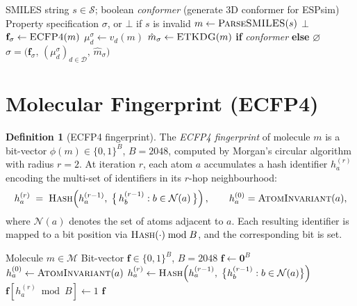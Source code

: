 \documentclass[11pt, a4paper]{article}
\theoremstyle{definition}
\newtheorem{definition}{Definition}[section]
\newcommand{\1}[1]{\mathbf{1}\!\left[#1\right]}   %
\newcommand{\Desc}{\mathcal{D}}                     %
\newcommand{\fp}[1]{\phi(#1)}                       %
\begin{document}
\begin{algorithm}[H]
\caption{\textsc{MakeSpec}$(s,\, \textit{conformer})$ --- construct a property specification}
\label{alg:makespec}
\begin{algorithmic}[1]
\Require SMILES string $s \in \mathcal{S}$;
         boolean \textit{conformer} (generate 3D conformer for ESPsim)
\Ensure  Property specification $\sigma$, or $\bot$ if $s$ is invalid
\State $m \leftarrow \textsc{ParseSMILES}(s)$
 \Return $\bot$ \EndIf
\State $\mathbf{f}_\sigma \leftarrow \textsc{ECFP4}(m)$
\For{$d \in \Desc$}
  \State $\mu_d^\sigma \leftarrow v_d(m)$
\EndFor
\State $\hat{m}_\sigma \leftarrow \textsc{ETKDG}(m)$ \textbf{if} \textit{conformer} \textbf{else} $\varnothing$
\Return $\sigma = \bigl(\mathbf{f}_\sigma,\, (\mu_d^\sigma)_{d \in \Desc},\, \hat{m}_\sigma\bigr)$
\end{algorithmic}
\end{algorithm}


\section{Molecular Fingerprint (ECFP4)}
\label{sec:ecfp4}

\begin{definition}[ECFP4 fingerprint]
\label{def:ecfp4}
The \emph{ECFP4 fingerprint} of molecule $m$ is a bit-vector
$\fp{m} \in \{0,1\}^B$, $B = 2048$, computed by Morgan's circular
algorithm with radius $r = 2$.
At iteration $r$, each atom $a$ accumulates a hash identifier
$h_a^{(r)}$ encoding the multi-set of identifiers in its $r$-hop
neighbourhood:
\[
  h_a^{(r)} \;=\; \textsc{Hash}\!\left(h_a^{(r-1)},\;
    \bigl\{\, h_b^{(r-1)} : b \in \mathcal{N}(a) \,\bigr\}\right),
  \qquad h_a^{(0)} = \textsc{AtomInvariant}(a),
\]
where $\mathcal{N}(a)$ denotes the set of atoms adjacent to $a$.
Each resulting identifier is mapped to a bit position via
$\textsc{Hash}(\cdot) \bmod B$, and the corresponding bit is set.
\end{definition}

\begin{algorithm}[H]
\caption{\textsc{ECFP4}$(m)$ --- compute the ECFP4 fingerprint}
\label{alg:ecfp4}
\begin{algorithmic}[1]
\Require Molecule $m \in \mathcal{M}$
\Ensure  Bit-vector $\mathbf{f} \in \{0,1\}^B$, $B = 2048$
\State $\mathbf{f} \leftarrow \mathbf{0}^B$
  \State $h_a^{(0)} \leftarrow \textsc{AtomInvariant}(a)$
\EndFor
{}
    \State $h_a^{(r)} \leftarrow \textsc{Hash}\!\left(h_a^{(r-1)},\;
           \bigl\{h_b^{(r-1)} : b \in \mathcal{N}(a)\bigr\}\right)$
    \State $\mathbf{f}\!\left[h_a^{(r)} \bmod B\right] \leftarrow 1$
  \EndFor
\EndFor
\Return $\mathbf{f}$
\end{algorithmic}
\end{algorithm}
\end{document}
